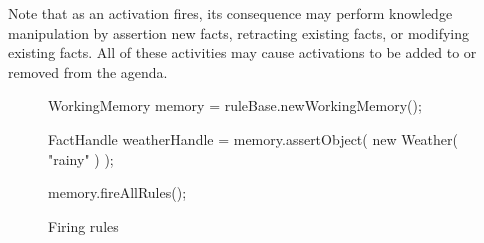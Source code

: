 Note that as an activation fires, its consequence
may perform knowledge manipulation by assertion new facts, retracting
existing facts, or modifying existing facts.  All of these activities
may cause activations to be added to or removed from the agenda.

\begin{figure}
\begin{javaCodelisting}
WorkingMemory memory = ruleBase.newWorkingMemory();

FactHandle weatherHandle = memory.assertObject( new Weather( "rainy" ) );

memory.fireAllRules();
\end{javaCodelisting}
\caption{Firing rules}
\label{workingmemory.fire}
\end{figure}


